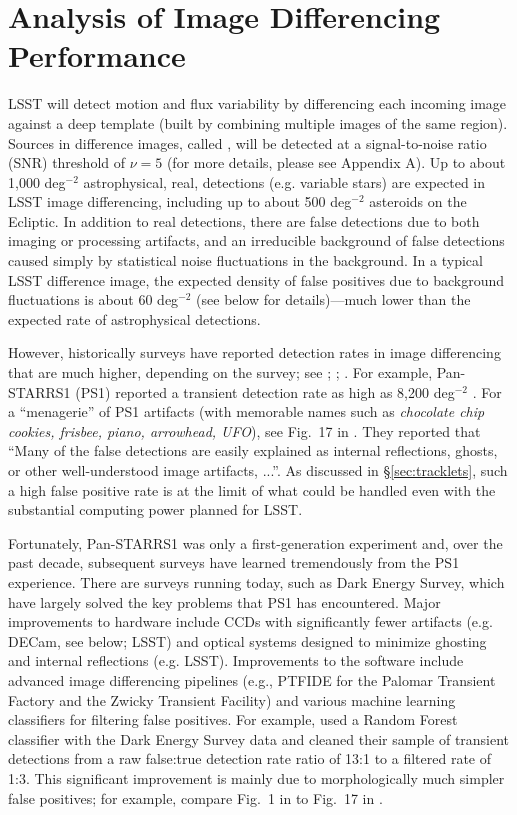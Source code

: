 \section{Analysis of Image Differencing Performance \label{sec:imDiff}}

LSST will detect motion and flux variability by differencing each incoming image
against a deep template (built by combining multiple images of the same region).
Sources in difference images, called \DIASources, will be detected at a signal-to-noise
ratio (SNR) threshold of $\nu=5$ (for more details, please see Appendix A). Up to about 1,000 deg$^{-2}$
astrophysical, real, detections (e.g. variable stars) are expected in LSST image differencing, including
up to about 500 deg$^{-2}$ asteroids on the Ecliptic. In addition to real detections,
there are false detections due to both imaging or processing artifacts, and an
irreducible background of false detections caused simply by statistical noise
fluctuations in the background. In a typical LSST difference image, the expected
density of false positives due to background fluctuations is about 60 deg$^{-2}$
(see below for details)---much lower than the expected rate of astrophysical
detections.

However, historically surveys have reported detection rates in image differencing that are much
higher, depending on the survey; see \cite{denneau13}; \cite{kessler15}; \cite{goldstein15}.
For example, Pan-STARRS1 (PS1) reported a transient detection rate as high as 8,200 deg$^{-2}$
\citep{denneau13}. For a ``menagerie'' of PS1 artifacts (with memorable names such as
{\it chocolate chip cookies, frisbee, piano, arrowhead, UFO}), see Fig.~17 in \cite{denneau13}.
They reported that ``Many of the false detections are easily explained as internal reflections,
ghosts, or other well-understood image artifacts, ...''. As discussed in \S\ref{sec:tracklets},
such a high false positive rate is at the limit of what could be handled even
with the substantial computing power planned for LSST.

Fortunately, Pan-STARRS1 was only a first-generation experiment and, over the past decade,
subsequent surveys have learned tremendously from the PS1 experience. There are surveys
running today, such as Dark Energy Survey, which have largely solved the key problems that
PS1 has encountered. Major improvements to hardware include CCDs with significantly fewer
artifacts (e.g. DECam, see below; LSST) and optical systems designed to minimize ghosting
and internal reflections (e.g. LSST). Improvements to the software include advanced image
differencing pipelines (e.g., PTFIDE for the Palomar Transient Factory and the Zwicky Transient
Facility) and various machine learning classifiers for filtering false positives. For example,
\cite{goldstein15} used a Random Forest classifier with the Dark Energy Survey data
and cleaned their sample of transient detections from a raw false:true detection
rate ratio of 13:1 to a filtered rate of 1:3. This significant improvement is
mainly due to morphologically much simpler false positives; for example, compare
Fig.~1 in \cite{goldstein15} to Fig.~17 in \cite{denneau13}.

